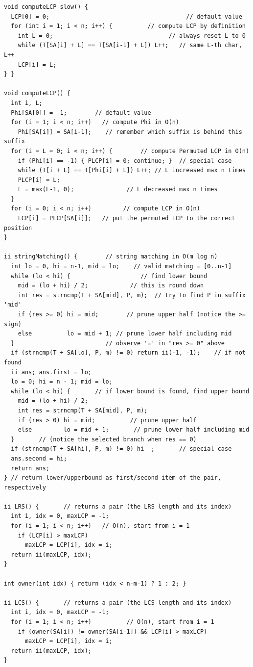 \documentclass[10pt,landscape]{article}
\begin{document}
\begin{multicols}{2}
\begin{lstlisting}
void computeLCP_slow() {
  LCP[0] = 0;                                       // default value
  for (int i = 1; i < n; i++) {          // compute LCP by definition
    int L = 0;                                 // always reset L to 0
    while (T[SA[i] + L] == T[SA[i-1] + L]) L++;   // same L-th char, L++
    LCP[i] = L;
} }

void computeLCP() {
  int i, L;
  Phi[SA[0]] = -1;        // default value
  for (i = 1; i < n; i++)   // compute Phi in O(n)
    Phi[SA[i]] = SA[i-1];    // remember which suffix is behind this suffix
  for (i = L = 0; i < n; i++) {        // compute Permuted LCP in O(n)
    if (Phi[i] == -1) { PLCP[i] = 0; continue; }  // special case
    while (T[i + L] == T[Phi[i] + L]) L++; // L increased max n times
    PLCP[i] = L;
    L = max(L-1, 0);               // L decreased max n times
  }
  for (i = 0; i < n; i++)         // compute LCP in O(n)
    LCP[i] = PLCP[SA[i]];   // put the permuted LCP to the correct position
}

ii stringMatching() {        // string matching in O(m log n)
  int lo = 0, hi = n-1, mid = lo;    // valid matching = [0..n-1]
  while (lo < hi) {                    // find lower bound
    mid = (lo + hi) / 2;            // this is round down
    int res = strncmp(T + SA[mid], P, m);  // try to find P in suffix 'mid'
    if (res >= 0) hi = mid;        // prune upper half (notice the >= sign)
    else          lo = mid + 1; // prune lower half including mid
  }                          // observe '=' in "res >= 0" above
  if (strncmp(T + SA[lo], P, m) != 0) return ii(-1, -1);    // if not found
  ii ans; ans.first = lo;
  lo = 0; hi = n - 1; mid = lo;
  while (lo < hi) {       // if lower bound is found, find upper bound
    mid = (lo + hi) / 2;
    int res = strncmp(T + SA[mid], P, m);
    if (res > 0) hi = mid;          // prune upper half
    else         lo = mid + 1;       // prune lower half including mid
  }       // (notice the selected branch when res == 0)
  if (strncmp(T + SA[hi], P, m) != 0) hi--;       // special case
  ans.second = hi;
  return ans;
} // return lower/upperbound as first/second item of the pair, respectively

ii LRS() {       // returns a pair (the LRS length and its index)
  int i, idx = 0, maxLCP = -1;
  for (i = 1; i < n; i++)   // O(n), start from i = 1
    if (LCP[i] > maxLCP)
      maxLCP = LCP[i], idx = i;
  return ii(maxLCP, idx);
}

int owner(int idx) { return (idx < n-m-1) ? 1 : 2; }

ii LCS() {       // returns a pair (the LCS length and its index)
  int i, idx = 0, maxLCP = -1;
  for (i = 1; i < n; i++)          // O(n), start from i = 1
    if (owner(SA[i]) != owner(SA[i-1]) && LCP[i] > maxLCP)
      maxLCP = LCP[i], idx = i;
  return ii(maxLCP, idx);
}
\end{lstlisting}

\end{multicols}
\end{document}
